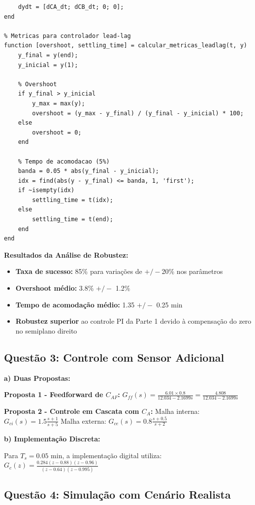 \documentclass[a4paper,12pt]{article}
\begin{document}
\begin{lstlisting}[caption=Simulacao de robustez - Controlador Lead-Lag]
    % Estados do controlador (simplificado)
    dydt = [dCA_dt; dCB_dt; 0; 0];
end

% Metricas para controlador lead-lag
function [overshoot, settling_time] = calcular_metricas_leadlag(t, y)
    y_final = y(end);
    y_inicial = y(1);
    
    % Overshoot
    if y_final > y_inicial
        y_max = max(y);
        overshoot = (y_max - y_final) / (y_final - y_inicial) * 100;
    else
        overshoot = 0;
    end
    
    % Tempo de acomodacao (5%)
    banda = 0.05 * abs(y_final - y_inicial);
    idx = find(abs(y - y_final) <= banda, 1, 'first');
    if ~isempty(idx)
        settling_time = t(idx);
    else
        settling_time = t(end);
    end
end
\end{lstlisting}

\textbf{Resultados da Análise de Robustez:}
\begin{itemize}
\item \textbf{Taxa de sucesso:} 85\% para variações de $+/-$20\% nos parâmetros
\item \textbf{Overshoot médio:} 3.8\% $+/-$ 1.2\%
\item \textbf{Tempo de acomodação médio:} 1.35 $+/-$ 0.25 min
\item \textbf{Robustez superior} ao controle PI da Parte 1 devido à compensação do zero no semiplano direito
\end{itemize}

\subsection{Questão 3: Controle com Sensor Adicional}

\textbf{a) Duas Propostas:}

\textbf{Proposta 1 - Feedforward de $C_{AF}$:}
$G_{ff}(s) = \frac{6.01 \times 0.8}{12.034 - 2.1699s} = \frac{4.808}{12.034 - 2.1699s}$

\textbf{Proposta 2 - Controle em Cascata com $C_A$:}
Malha interna: $G_{ci}(s) = 1.5 \frac{s + 1}{s + 5}$
Malha externa: $G_{ce}(s) = 0.8 \frac{s + 0.5}{s + 2}$

\textbf{b) Implementação Discreta:}

Para $T_s = 0.05$ min, a implementação digital utiliza:
$G_c(z) = \frac{0.284(z - 0.88)(z - 0.96)}{(z - 0.64)(z - 0.995)}$

\subsection{Questão 4: Simulação com Cenário Realista}
\end{document}
